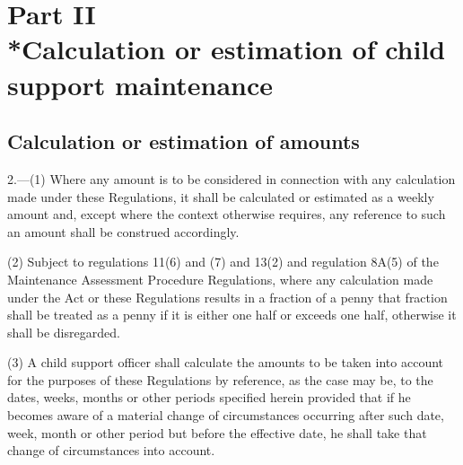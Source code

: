 \documentclass[12pt,a4paper]{article}
\begin{document}
\section[Part II --- Calculation or estimation of child support maintenance]{\sloppy Part II\\*Calculation or estimation of child support maintenance}

\renewcommand\parthead{--- Part II}

\subsection[2. Calculation or estimation of amounts]{Calculation or estimation of amounts}

2.—(1) Where any amount 
is to be considered in connection with any calculation made under these Regulations,  %
it shall be calculated or estimated as a weekly amount and, except where the context otherwise requires, any reference to such an amount shall be construed accordingly.

(2) Subject to 
regulations 11(6) and (7) and 13(2) and 
  regulation 8A(5)  %
of the Maintenance Assessment Procedure Regulations,  %
where any calculation made under 
the Act or  %
these Regulations results in a fraction of a penny that fraction shall be treated as a penny if it is either one half or exceeds one half, otherwise it shall be disregarded.

(3) A child support officer shall calculate the amounts to be taken into account for the purposes of these Regulations by reference, as the case may be, to the dates, weeks, months or other periods specified herein provided that if he becomes aware of a material change of circumstances occurring after such date, week, month or other period but before the effective date, he shall take that change of circumstances into account.

\end{document}
